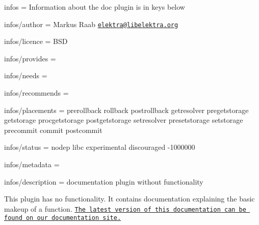 
\begin{DoxyItemize}
\item infos = Information about the doc plugin is in keys below
\item infos/author = Markus Raab \href{mailto:elektra@libelektra.org}{\tt elektra@libelektra.\+org}
\item infos/licence = B\+SD
\item infos/provides =
\item infos/needs =
\item infos/recommends =
\item infos/placements = prerollback rollback postrollback getresolver pregetstorage getstorage procgetstorage postgetstorage setresolver presetstorage setstorage precommit commit postcommit
\item infos/status = nodep libc experimental discouraged -\/1000000
\item infos/metadata =
\item infos/description = documentation plugin without functionality
\end{DoxyItemize}

This plugin has no functionality. It contains documentation explaining the basic makeup of a function. \href{https://doc.libelektra.org/api/latest/html/group__plugin.html}{\tt The latest version of this documentation can be found on our documentation site.} 